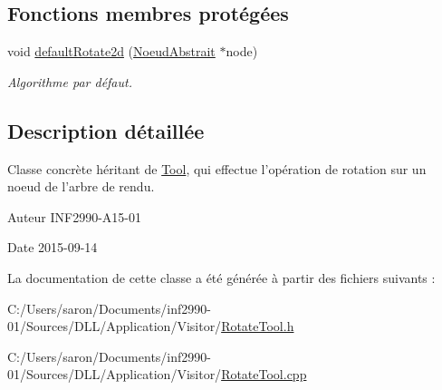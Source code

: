 \subsection*{Fonctions membres protégées}
\begin{DoxyCompactItemize}
\item 
\hypertarget{group__inf2990_ga3d7a6452fd82b9684e5e24ed3aeef6b5}{void \hyperlink{group__inf2990_ga3d7a6452fd82b9684e5e24ed3aeef6b5}{default\-Rotate2d} (\hyperlink{class_noeud_abstrait}{Noeud\-Abstrait} $\ast$node)}\label{group__inf2990_ga3d7a6452fd82b9684e5e24ed3aeef6b5}

\begin{DoxyCompactList}\small\item\em Algorithme par défaut. \end{DoxyCompactList}\end{DoxyCompactItemize}


\subsection{Description détaillée}
Classe concrète héritant de \hyperlink{class_tool}{Tool}, qui effectue l'opération de rotation sur un noeud de l'arbre de rendu. 

\begin{DoxyAuthor}{Auteur}
I\-N\-F2990-\/\-A15-\/01 
\end{DoxyAuthor}
\begin{DoxyDate}{Date}
2015-\/09-\/14 
\end{DoxyDate}


La documentation de cette classe a été générée à partir des fichiers suivants \-:\begin{DoxyCompactItemize}
\item 
C\-:/\-Users/saron/\-Documents/inf2990-\/01/\-Sources/\-D\-L\-L/\-Application/\-Visitor/\hyperlink{_rotate_tool_8h}{Rotate\-Tool.\-h}\item 
C\-:/\-Users/saron/\-Documents/inf2990-\/01/\-Sources/\-D\-L\-L/\-Application/\-Visitor/\hyperlink{_rotate_tool_8cpp}{Rotate\-Tool.\-cpp}\end{DoxyCompactItemize}
